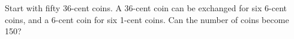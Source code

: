Start with fifty 36-cent coins. A 36-cent coin can be exchanged for six 6-cent coins, and a 6-cent coin for six 1-cent coins. Can the number of coins become 150?
